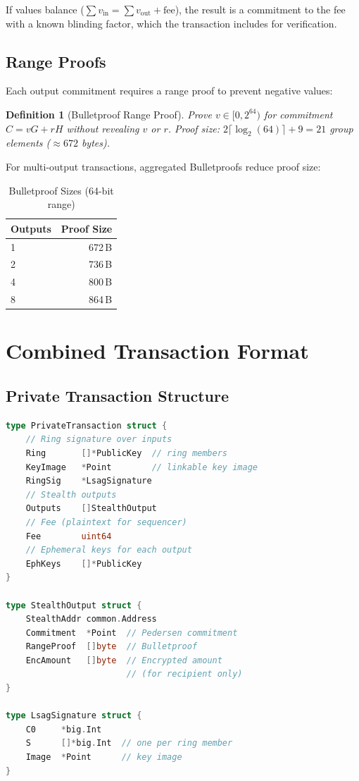 \documentclass[11pt,a4paper]{article}
\newtheorem{definition}{Definition}[section]
\begin{document}
If values balance ($\sum v_{\mathrm{in}} = \sum v_{\mathrm{out}} + \mathrm{fee}$),
the result is a commitment to the fee with a known blinding factor, which
the transaction includes for verification.

\subsection{Range Proofs}

Each output commitment requires a range proof to prevent negative values:

\begin{definition}[Bulletproof Range Proof]
    Prove $v \in [0, 2^{64})$ for commitment $C = vG + rH$ without
    revealing $v$ or $r$.  Proof size: $2 \lceil \log_2(64) \rceil + 9 =
    21$ group elements ($\approx 672$ bytes).
\end{definition}

For multi-output transactions, aggregated Bulletproofs reduce proof size:

\begin{table}[h]
\centering
\caption{Bulletproof Sizes (64-bit range)}
\label{tab:bp-sizes}
\begin{tabular}{@{}lr@{}}
\toprule
\textbf{Outputs} & \textbf{Proof Size} \\
\midrule
1 & 672\,B \\
2 & 736\,B \\
4 & 800\,B \\
8 & 864\,B \\
\bottomrule
\end{tabular}
\end{table}

\section{Combined Transaction Format}
\label{sec:combined}

\subsection{Private Transaction Structure}

\begin{lstlisting}[language=Go,caption={Private Transaction Format}]
type PrivateTransaction struct {
    // Ring signature over inputs
    Ring       []*PublicKey  // ring members
    KeyImage   *Point        // linkable key image
    RingSig    *LsagSignature
    // Stealth outputs
    Outputs    []StealthOutput
    // Fee (plaintext for sequencer)
    Fee        uint64
    // Ephemeral keys for each output
    EphKeys    []*PublicKey
}

type StealthOutput struct {
    StealthAddr common.Address
    Commitment  *Point  // Pedersen commitment
    RangeProof  []byte  // Bulletproof
    EncAmount   []byte  // Encrypted amount
                        // (for recipient only)
}

type LsagSignature struct {
    C0     *big.Int
    S      []*big.Int  // one per ring member
    Image  *Point      // key image
}
\end{lstlisting}
\end{document}

